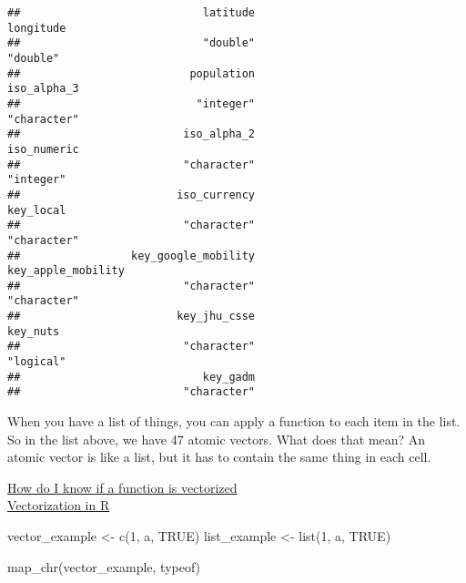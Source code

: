 \documentclass[
]{book}
\newenvironment{Shaded}{\begin{snugshade}}{\end{snugshade}}
\newcommand{\ConstantTok}[1]{\textcolor[rgb]{0.00,0.00,0.00}{#1}}
\newcommand{\DecValTok}[1]{\textcolor[rgb]{0.00,0.00,0.81}{#1}}
\newcommand{\FunctionTok}[1]{\textcolor[rgb]{0.00,0.00,0.00}{#1}}
\newcommand{\NormalTok}[1]{#1}
\newcommand{\OtherTok}[1]{\textcolor[rgb]{0.56,0.35,0.01}{#1}}
\newcommand{\StringTok}[1]{\textcolor[rgb]{0.31,0.60,0.02}{#1}}
\begin{document}
\begin{verbatim}
##                            latitude                           longitude 
##                            "double"                            "double" 
##                          population                         iso_alpha_3 
##                           "integer"                         "character" 
##                         iso_alpha_2                         iso_numeric 
##                         "character"                           "integer" 
##                        iso_currency                           key_local 
##                         "character"                         "character" 
##                 key_google_mobility                  key_apple_mobility 
##                         "character"                         "character" 
##                        key_jhu_csse                            key_nuts 
##                         "character"                           "logical" 
##                            key_gadm 
##                         "character"
\end{verbatim}

When you have a list of things, you can apply a function to each item in the list. So in the list above, we have 47 atomic vectors. What does that mean? An atomic vector is like a list, but it has to contain the same thing in each cell.

\href{https://stackoverflow.com/questions/58568392/how-do-i-know-a-function-or-an-operation-in-r-is-vectorized\#:~:text=To\%20identify\%20if\%20an\%20R\%20object\%20is\%20a\%20vector\%20\%2C\%20I,a\%20vector\%20or\%20False\%20otherwise.}{How do I know if a function is vectorized}\\
\href{https://www.noamross.net/archives/2014-04-16-vectorization-in-r-why/}{Vectorization in R}

\begin{Shaded}
\begin{Highlighting}[]
\NormalTok{vector\_example }\OtherTok{\textless{}{-}} \FunctionTok{c}\NormalTok{(}\DecValTok{1}\NormalTok{, }\StringTok{\textquotesingle{}a\textquotesingle{}}\NormalTok{, }\ConstantTok{TRUE}\NormalTok{)}
\NormalTok{list\_example }\OtherTok{\textless{}{-}} \FunctionTok{list}\NormalTok{(}\DecValTok{1}\NormalTok{, }\StringTok{\textquotesingle{}a\textquotesingle{}}\NormalTok{, }\ConstantTok{TRUE}\NormalTok{)}

\FunctionTok{map\_chr}\NormalTok{(vector\_example, typeof)}
\end{Highlighting}
\end{Shaded}
\end{document}
